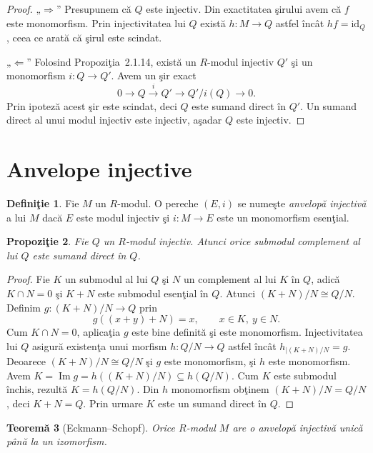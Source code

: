 \documentclass[12pt,a4paper]{book}
\theoremstyle{plain}
\newtheorem{theorem}{Teoremă}[section] %
\newtheorem{proposition}[theorem]{Propoziţie}
\theoremstyle{definition}
\newtheorem{definition}[theorem]{Definiţie}
\theoremstyle{remark}
\begin{document}
\begin{proof}
„$\Rightarrow$”\;
Presupunem că $Q$ este injectiv.
Din exactitatea şirului avem că $f$ este monomorfism.
Prin injectivitatea lui $Q$ există $h : M \to Q$ astfel încât
$h f = \mathrm{id}_Q$, ceea ce arată că şirul este scindat.

„$\Leftarrow$”\;
Folosind Propoziţia~2.1.14, există un $R$-modul injectiv $Q'$ şi
un monomorfism $i : Q \to Q'$.
Avem un şir exact
\[
0 \longrightarrow Q \xrightarrow{i} Q' \longrightarrow Q'/i(Q) \longrightarrow 0.
\]
Prin ipoteză acest şir este scindat, deci $Q$ este sumand direct în $Q'$.
Un sumand direct al unui modul injectiv este injectiv, aşadar $Q$ este injectiv.
\end{proof}



\section{Anvelope injective}

\begin{definition}
Fie $M$ un $R$-modul.
O pereche $(E,i)$ se numeşte \emph{anvelopă injectivă} a lui $M$ dacă
$E$ este modul injectiv şi $i : M \to E$ este un monomorfism esenţial.
\end{definition}

\begin{proposition}
Fie $Q$ un $R$-modul injectiv.
Atunci orice submodul complement al lui $Q$ este sumand direct în $Q$.
\end{proposition}

\begin{proof}
Fie $K$ un submodul al lui $Q$ şi $N$ un complement al lui $K$ în $Q$,
adică $K \cap N = 0$ şi $K+N$ este submodul esenţial în $Q$.
Atunci $(K+N)/N \cong Q/N$.
Definim $g : (K+N)/N \to Q$ prin
\[
g((x+y)+N) = x, \qquad x \in K,\ y \in N.
\]
Cum $K \cap N = 0$, aplicaţia $g$ este bine definită şi este monomorfism.
Injectivitatea lui $Q$ asigură existenţa unui morfism
$h : Q/N \to Q$ astfel încât $h_{\mid (K+N)/N} = g$.
Deoarece $(K+N)/N \cong Q/N$ şi $g$ este monomorfism, şi $h$ este monomorfism.
Avem $K = \operatorname{Im} g = h((K+N)/N) \subseteq h(Q/N)$.
Cum $K$ este submodul închis, rezultă $K = h(Q/N)$.
Din $h$ monomorfism obţinem $(K+N)/N = Q/N$, deci $K+N = Q$.
Prin urmare $K$ este un sumand direct în $Q$.
\end{proof}

\begin{theorem}[Eckmann--Schopf]
Orice $R$-modul $M$ are o anvelopă injectivă unică până la un izomorfism.
\end{theorem}
\end{document}
